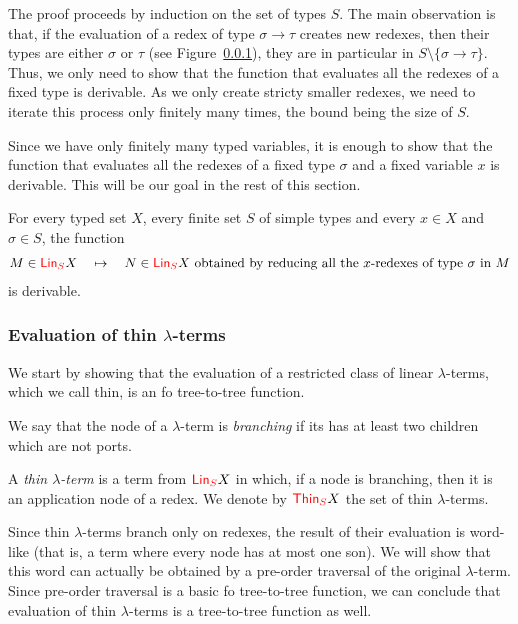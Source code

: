 The proof proceeds by induction on the set of types $S$. The main observation is that, if the evaluation of a redex of type $\sigma\rightarrow \tau$ creates new redexes, then their types are either $\sigma$ or $\tau$ (see Figure~\ref{}), they are in particular in $S\setminus\{\sigma\rightarrow\tau\}$. Thus, we only need to show that the function that evaluates all the redexes of a fixed type is derivable. As we only create stricty smaller redexes, we need to iterate this process only finitely many times, the bound being the size of $S$. 

  Since we have only finitely many typed variables, it is enough to show that the function that evaluates all the redexes of a fixed type $\sigma$ and a fixed variable $x$ is derivable. This will be our goal in the rest of this section.

\begin{theorem}\label{thm:evalOneType}
 For every typed set $X$, every finite set $S$ of simple types and every $x\in X$ and $\sigma\in S$, the function 
    \begin{align*}
        M \in  {\color{red}{\mathsf{Lin}_{S}}} X \quad \mapsto \quad N \in {\color{red}{\mathsf{Lin}_{S}}} X \text{ obtained by reducing all the $x$-redexes of type $\sigma$ in $M$} 
    \end{align*}
    is derivable.
\end{theorem}



\subsubsection{Evaluation of thin $\lambda$-terms}

We start by showing that the evaluation of a restricted class of linear $\lambda$-terms, which we call thin, is an fo tree-to-tree function.   

\begin{definition}
We say that the node of a $\lambda$-term is \emph{branching} if its has at least two children which are not ports.
 
A \emph{thin $\lambda$-term} is a term from ${\color{red}{\mathsf{Lin}_{S}}} X$ in which, if a node is branching, then it is an application node of a redex. We denote by ${\color{red}{\mathsf{Thin}_{S}}} X$ the set of thin $\lambda$-terms.
\end{definition}

Since thin $\lambda$-terms branch only on redexes, the result of their evaluation is word-like (that is, a term where every node has at most one son).  We will show that this word can actually be obtained by a pre-order traversal of the original $\lambda$-term. 
Since pre-order traversal is a basic fo tree-to-tree function, we can conclude that evaluation of thin $\lambda$-terms is a tree-to-tree function as well. 

